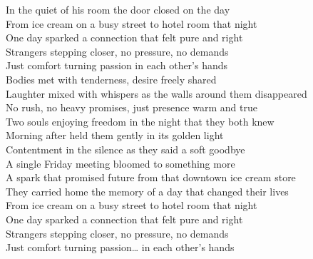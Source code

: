 \begin{lyrics}
In the quiet of his room the door closed on the day\\

From ice cream on a busy street to hotel room that night\\
One day sparked a connection that felt pure and right\\
Strangers stepping closer, no pressure, no demands\\
Just comfort turning passion in each other’s hands\\

Bodies met with tenderness, desire freely shared\\
Laughter mixed with whispers as the walls around them disappeared\\
No rush, no heavy promises, just presence warm and true\\
Two souls enjoying freedom in the night that they both knew\\

Morning after held them gently in its golden light\\
Contentment in the silence as they said a soft goodbye\\
A single Friday meeting bloomed to something more\\
A spark that promised future from that downtown ice cream store\\

They carried home the memory of a day that changed their lives\\

From ice cream on a busy street to hotel room that night\\
One day sparked a connection that felt pure and right\\
Strangers stepping closer, no pressure, no demands\\
Just comfort turning passion… in each other’s hands
\end{lyrics}

